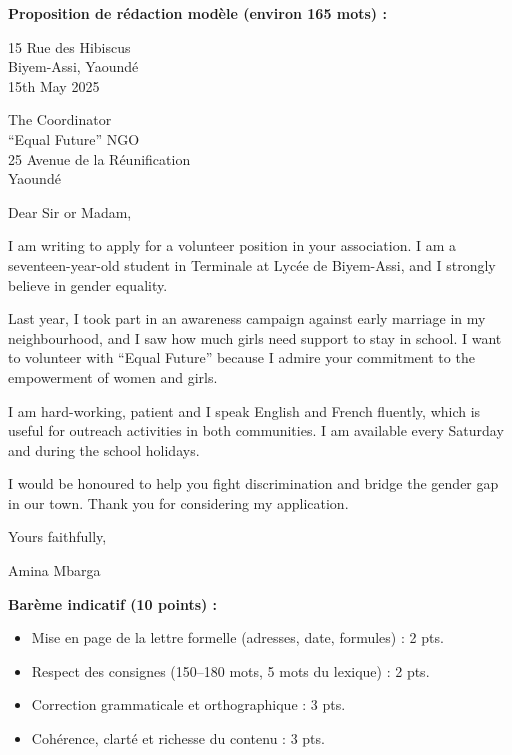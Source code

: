 \documentclass[11pt]{article}
\begin{document}
\begin{corrige}
\textbf{Proposition de rédaction modèle (environ 165 mots) :}

\begin{textebox}
15 Rue des Hibiscus\\
Biyem-Assi, Yaoundé\\
15th May 2025

The Coordinator\\
“Equal Future” NGO\\
25 Avenue de la Réunification\\
Yaoundé

Dear Sir or Madam,

I am writing to apply for a volunteer position in your association. I am a seventeen-year-old student in Terminale at Lycée de Biyem-Assi, and I strongly believe in gender equality.

Last year, I took part in an awareness campaign against early marriage in my neighbourhood, and I saw how much girls need support to stay in school. I want to volunteer with “Equal Future” because I admire your commitment to the empowerment of women and girls.

I am hard-working, patient and I speak English and French fluently, which is useful for outreach activities in both communities. I am available every Saturday and during the school holidays.

I would be honoured to help you fight discrimination and bridge the gender gap in our town. Thank you for considering my application.

Yours faithfully,

Amina Mbarga
\end{textebox}

\textbf{Barème indicatif (10 points) :}
\begin{itemize}
\item Mise en page de la lettre formelle (adresses, date, formules) : 2 pts.
\item Respect des consignes (150--180 mots, 5 mots du lexique) : 2 pts.
\item Correction grammaticale et orthographique : 3 pts.
\item Cohérence, clarté et richesse du contenu : 3 pts.
\end{itemize}


\end{corrige}
\end{document}
